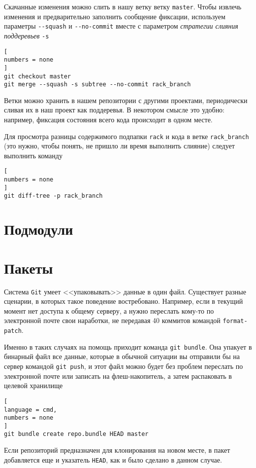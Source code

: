 \documentclass[%
	11pt,
	a4paper,
	utf8,
		]{article}
\begin{document}
Скачанные изменения можно слить в нашу ветку ветку \texttt{master}. Чтобы извлечь изменения и предварительно заполнить сообщение фиксации, используем параметры \verb|--squash| и \verb|--no-commit| вместе с параметром \emph{стратегии слияния поддеревьев} \texttt{-s}
\begin{lstlisting}[
numbers = none
]
git checkout master
git merge --squash -s subtree --no-commit rack_branch
\end{lstlisting}

Ветки можно хранить в нашем репозитории с другими проектами, периодически сливая их в наш проект как поддеревья. В некотором смысле это удобно: например, фиксация состояния всего кода происходит в одном месте.

Для просмотра разницы содержимого подпапки \texttt{rack} и кода в ветке \texttt{rack\_branch} (это нужно, чтобы понять, не пришло ли время выполнить слияние) следует выполнить команду
\begin{lstlisting}[
numbers = none
]
git diff-tree -p rack_branch
\end{lstlisting}

\section{Подмодули}

\section{Пакеты}

Система \texttt{Git} умеет <<упаковывать>> данные в один файл. Существует разные сценарии, в которых такое поведение востребовано. Например, если в текущий момент нет доступа к общему серверу, а нужно переслать кому-то по электронной почте свои наработки, не передавая 40 коммитов командой \texttt{format-patch}.

Именно в таких случаях на помощь приходит команда \texttt{git bundle}. Она упакует в бинарный файл все данные, которые в обычной ситуации вы отправили бы на сервер командой \texttt{git push}, и этот файл можно будет без проблем переслать по электронной почте или записать на флеш-накопитель, а затем распаковать в целевой хранилище
\begin{lstlisting}[
language = cmd,
numbers = none
]
git bundle create repo.bundle HEAD master
\end{lstlisting}

Если репозиторий предназначен для клонирования на новом месте, в пакет добавляется еще и указатель \texttt{HEAD}, как и было сделано в данном случае.
\end{document}
